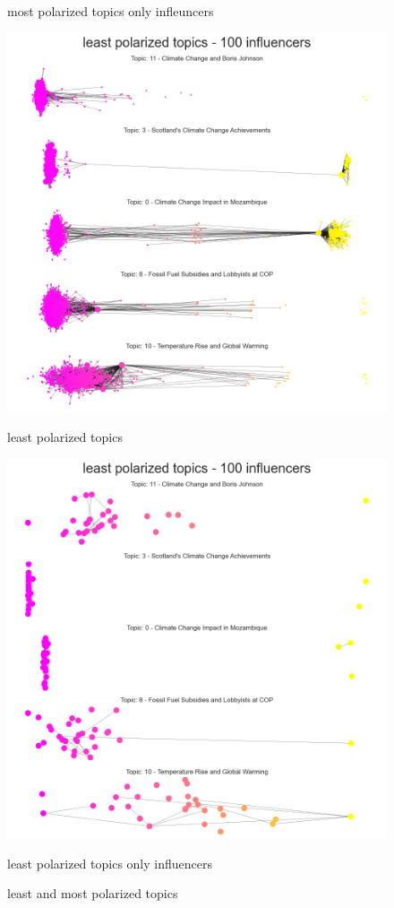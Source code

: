 \begin{figure}
\begin{minipage}{0.50\textwidth}
        \caption{most polarized topics only infleuncers}
    \end{minipage}
    \begin{minipage}{0.50\textwidth}
        \centering
         \includegraphics[width=0.98\linewidth]{Chapter5//figures/least_pol_cop26.png}
        \caption{least polarized topics}
    \end{minipage}\hfill
    \begin{minipage}{0.50\textwidth}
        \centering
         \includegraphics[width=0.98\linewidth]{Chapter5//figures/least_pol_cop26_inf.png}
        \caption{least polarized topics only influencers}
    \end{minipage}

    \caption{least and most polarized topics}
    \label{fig:networks_polarization}
\end{figure}


